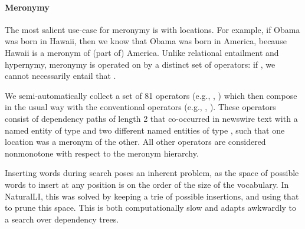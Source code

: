 \paragraph{Meronymy}
The most salient use-case for meronymy is with locations.
For example, if Obama was born in Hawaii, then we know that Obama was born in
  America, because Hawaii is a meronym of (part of) America.
Unlike relational entailment and hypernymy, meronymy is operated on by a
  distinct set of operators:
  if , we cannot necessarily entail that .


We semi-automatically collect a set of 81 operators
  (e.g., , )
  which then compose in the usual way with the
  conventional operators (e.g., , ).
These operators consist of dependency paths of length 2 
that co-occurred in newswire text with a named entity of type 
 and two different named entities of type , 
such that one location was a meronym of the other.
All other operators are considered nonmonotone with
  respect to the meronym hierarchy.



%
%
Inserting words during search poses an inherent problem, 
  as the space of possible words to insert at any
  position is on the order of the size of the vocabulary.
In NaturalLI, this was solved by keeping a trie of possible insertions, and
  using that to prune this space.
This is both computationally slow and adapts awkwardly to a search over
  dependency trees.

